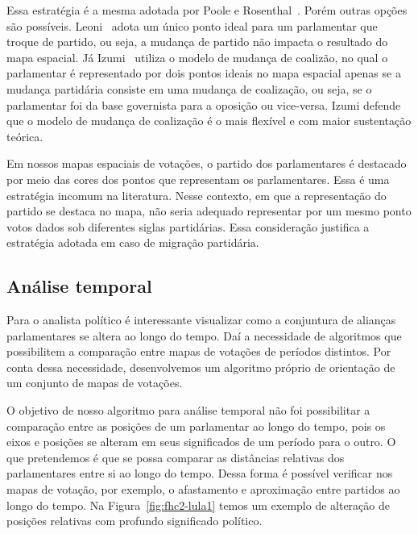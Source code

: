 \documentclass[
	article,			%
	12pt,				%
	oneside,			%
	a4paper,			%
	english,			%
	brazil,				%
	sumario=tradicional,
	oldfontcommands %
	]{abntex2}
\begin{document}
Essa estratégia é a mesma adotada por Poole e Rosenthal~\cite{poole2007ideology}. Porém outras opções são possíveis. Leoni~\cite{leoni02cdep} adota um único ponto ideal para um parlamentar que troque de partido, ou seja, a mudança de partido não impacta o resultado do mapa espacial. Já Izumi~\cite{izumi2016senado} utiliza o modelo de mudança de coalizão, no qual o parlamentar é representado por dois pontos ideais no mapa espacial apenas se a mudança partidária consiste em uma mudança de coalização, ou seja, se o parlamentar foi da base governista para a oposição ou vice-versa. Izumi defende que o modelo de mudança de coalização é o mais flexível e com maior sustentação teórica. 

Em nossos mapas espaciais de votações, o partido dos parlamentares é destacado por meio das cores dos pontos que representam os parlamentares. Essa é uma estratégia incomum na literatura. Nesse contexto, em que a representação do partido se destaca no mapa, não seria adequado representar por um mesmo ponto votos dados sob diferentes siglas partidárias. Essa consideração justifica a estratégia adotada em caso de migração partidária.

\subsection{Análise temporal}

Para o analista político é interessante visualizar como a conjuntura de alianças parlamentares se altera ao longo do tempo. Daí a necessidade de algoritmos que possibilitem a comparação entre mapas de votações de períodos distintos. Por conta dessa necessidade, desenvolvemos um algoritmo próprio de orientação de um conjunto de mapas de votações.

O objetivo de nosso algoritmo para análise temporal não foi possibilitar a comparação entre as posições de um parlamentar ao longo do tempo, pois os eixos e posições se alteram em seus significados de um período para o outro. O que pretendemos é que se possa comparar as distâncias relativas dos parlamentares entre si ao longo do tempo. Dessa forma é possível verificar nos mapas de votação, por exemplo, o afastamento e aproximação entre partidos ao longo do tempo. Na Figura~\ref{fig:fhc2-lula1} temos um exemplo de alteração de posições relativas com profundo significado político. \\
\end{document}
